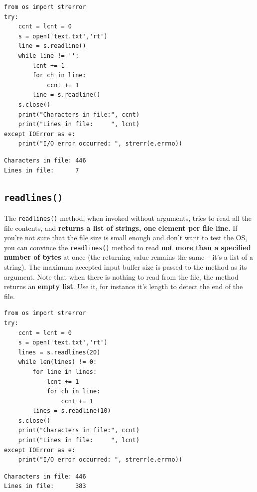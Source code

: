 \documentclass[11pt]{article}
\begin{document}
\begin{verbatim}
from os import strerror
try:
	ccnt = lcnt = 0
	s = open('text.txt','rt')
	line = s.readline()
	while line != '':
		lcnt += 1
		for ch in line:
			ccnt += 1
		line = s.readline()
	s.close()
	print("Characters in file:", ccnt)
	print("Lines in file:     ", lcnt)
except IOError as e:
	print("I/O error occurred: ", strerr(e.errno))
\end{verbatim}

\begin{verbatim}
Characters in file: 446
Lines in file:      7
\end{verbatim}

\subsection{\texttt{readlines()}}
\label{sec:org38c01e0}
The \texttt{readlines()} method, when invoked without arguments, tries to
read all the file contents, and \textbf{returns a list of strings, one}
\textbf{element per file line.} If you’re not sure that the file size is
small enough and don’t want to test the OS, you can convince the
\texttt{readlines()} method to read \textbf{not more than a specified number of
bytes} at once (the returning value remains the same – it’s a list of
a string).  The maximum accepted input buffer size is passed to the
method as its argument. Note that when there is nothing to read from
the file, the method returns an \textbf{empty list}. Use it, for instance
it's length to detect the end of the file.


\begin{verbatim}
from os import strerror
try:
	ccnt = lcnt = 0
	s = open('text.txt','rt')
	lines = s.readlines(20)
	while len(lines) != 0:
		for line in lines:
			lcnt += 1
			for ch in line:
				ccnt += 1
		lines = s.readline(10)
	s.close()
	print("Characters in file:", ccnt)
	print("Lines in file:     ", lcnt)
except IOError as e:
	print("I/O error occurred: ", strerr(e.errno))
\end{verbatim}

\begin{verbatim}
Characters in file: 446
Lines in file:      383
\end{verbatim}

\vspace{10 mm}
\end{document}
